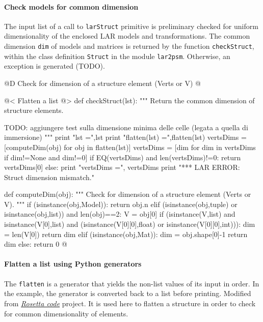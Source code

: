 \documentclass[11pt,oneside]{article}    %
\begin{document}
\paragraph{Check models for common dimension}
The input list of a call to \texttt{larStruct} primitive is preliminary checked for uniform dimensionality of the enclosed LAR models and transformations. The common dimension \texttt{dim} of models and matrices is returned by the function \texttt{checkStruct}, within the class definition \texttt{Struct} in the module \texttt{lar2psm}. Otherwise, an exception is generated (TODO).


@D Check for dimension of a structure element (Verts or V)
@{@< Flatten a list @>
def checkStruct(lst):
    """ Return the common dimension of structure elements.

        TODO: aggiungere test sulla dimensione minima delle celle (legata a quella di immersione)
    """
    print "lst =",lst
    print "flatten(lst) =",flatten(lst)
    vertsDims = [computeDim(obj) for obj in flatten(lst)]
    vertsDims = [dim for dim in vertsDims if dim!=None and dim!=0]
    if EQ(vertsDims) and len(vertsDims)!=0: 
        return vertsDims[0]
    else: 
        print "\n vertsDims =", vertsDims
        print "*** LAR ERROR: Struct dimension mismatch."

def computeDim(obj):
    """ Check for dimension of a structure element (Verts or V). 
    """
    if (isinstance(obj,Model)):
        return obj.n
    elif (isinstance(obj,tuple) or isinstance(obj,list)) and len(obj)==2:
        V = obj[0]
        if (isinstance(V,list) and isinstance(V[0],list) and 
                (isinstance(V[0][0],float) or isinstance(V[0][0],int))): 
            dim = len(V[0])
            return dim
    elif (isinstance(obj,Mat)):
        dim = obj.shape[0]-1
        return dim
    else: return 0
@}

\paragraph{Flatten a list using Python generators}
The \texttt{flatten} is a generator that yields the non-list values of its input in order. In the example, the generator is converted back to a list before printing. Modified from \href{http://rosettacode.org/wiki/Flatten_a_list#Python}{\emph{Rosetta code}} project. It is used here to flatten a structure in order to check for common dimensionality of elements.
\end{document}
